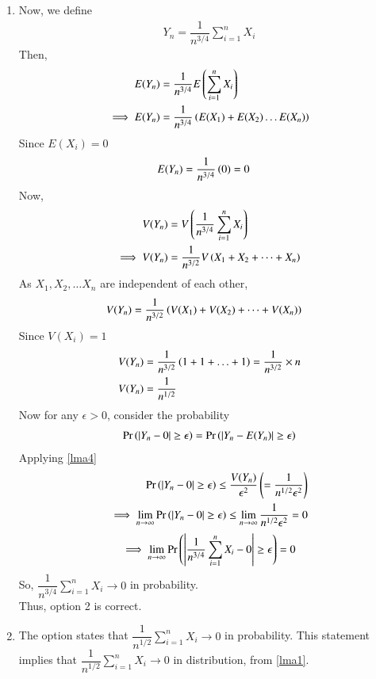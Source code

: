 \documentclass[journal,12pt,twocolumn]{IEEEtran}
\begin{document}
\begin{enumerate}
\item Now, we define
\begin{align}
    Y_n=\dfrac{1}{n^{3/4}}\sum_{i=1}^n X_i
\end{align}
Then,
\begin{align}
    E(Y_n) &= \dfrac{1}{n^{3/4}}E\left(\sum_{i=1}^n X_i\right) \\
    \implies E(Y_n) &= \dfrac{1}{n^{3/4}}\left(E(X_1)+E(X_2) \ldots E(X_n)\right)
\end{align}
Since $E(X_i) = 0$
\begin{align}
    E(Y_n) &= \dfrac{1}{n^{3/4}}\left(0\right) =0
\end{align}
Now,
\begin{align}
    V(Y_n) &= V\left(\dfrac{1}{n^{3/4}}\sum_{i=1}^n X_i\right) \\
    \implies V(Y_n) &= \dfrac{1}{n^{3/2}}V\left(X_1+X_2+ \dots +X_n\right)
\end{align}
As $X_1, X_2, \ldots X_n$ are independent of each other,
\begin{align}
    V(Y_n) &= \dfrac{1}{n^{3/2}}\left(V(X_1)+V(X_2)+ \dots +V(X_n)\right)
\end{align}
Since $V(X_i) = 1$
\begin{align}
    V(Y_n)&=\dfrac{1}{n^{3/2}}\left(1+1+ \ldots +1\right)=\dfrac{1}{n^{3/2}}\times n\\
    V(Y_n)&=\dfrac{1}{n^{1/2}}
\end{align}
Now for any $\epsilon>0$, consider the probability
\begin{align}
    \Pr\left(|Y_n-0|\geq \epsilon\right)=\Pr\left(|Y_n-E(Y_n)|\geq \epsilon\right)
\end{align}
Applying \ref{lma4}
\begin{align}
    \Pr\left(|Y_n-0|\geq \epsilon\right) \leq \dfrac{V(Y_n)}{\epsilon^2} \left(= \dfrac{1}{n^{1/2}\epsilon^2}\right)\\
    \implies \lim_{n \to \infty}\Pr\left(|Y_n-0|\geq \epsilon\right) \leq \lim_{n \to \infty }\dfrac{1}{n^{1/2}\epsilon^2}=0
\end{align}
\begin{align}
    \implies \lim_{n \to \infty}\Pr\left(\left | \dfrac{1}{n^{3/4}}\sum_{i=1}^n X_i - 0 \right|\geq \epsilon\right)=0
\end{align}
So, $\dfrac{1}{n^{3/4}}\sum_{i=1}^n X_i \to 0$ in probability.\\
Thus, option 2 is correct.

\item The option states that
\begin{math}
 \dfrac{1}{n^{1/2}} \sum_{i=1}^n X_i \to 0
\end{math} 
in probability. This statement implies that $\dfrac{1}{n^{1/2}} \sum_{i=1}^n X_i \to 0$ in distribution, from \ref{lma1}.\vspace{0.2cm}


\end{enumerate}
\end{document}

